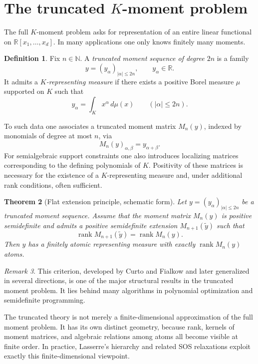 \documentclass[11pt]{amsart}
\numberwithin{equation}{section}
\newtheorem{theorem}{Theorem}[section]
\theoremstyle{definition}
\newtheorem{definition}[theorem]{Definition}
\theoremstyle{remark}
\newtheorem{remark}[theorem]{Remark}
\newcommand{\R}{\mathbb{R}}
\newcommand{\N}{\mathbb{N}}
\newcommand{\Rxd}{\R[x_1,\dots,x_d]}
\newcommand{\rank}{\operatorname{rank}}
\newcommand{\1}{\mathbf{1}}
\begin{document}
\section{The truncated \(K\)-moment problem}\label{sec:truncated}

The full \(K\)-moment problem asks for representation of an entire linear functional on \(\Rxd\). In many applications one only knows finitely many moments.

\begin{definition}
Fix \(n\in\N\). A \emph{truncated moment sequence of degree \(2n\)} is a family
\[
y=(y_\alpha)_{|\alpha|\le 2n}, \qquad y_\alpha\in\R.
\]
It admits a \emph{\(K\)-representing measure} if there exists a positive Borel measure \(\mu\) supported on \(K\) such that
\[
y_\alpha=\int_K x^\alpha\,d\mu(x) \qquad (|\alpha|\le 2n).
\]
\end{definition}

To such data one associates a truncated moment matrix \(M_n(y)\), indexed by monomials of degree at most \(n\), via
\[
M_n(y)_{\alpha,\beta}=y_{\alpha+\beta}.
\]
For semialgebraic support constraints one also introduces localizing matrices corresponding to the defining polynomials of \(K\). Positivity of these matrices is necessary for the existence of a \(K\)-representing measure and, under additional rank conditions, often sufficient.

\begin{theorem}[Flat extension principle, schematic form]\label{thm:flat}
Let \(y=(y_\alpha)_{|\alpha|\le 2n}\) be a truncated moment sequence. Assume that the moment matrix \(M_n(y)\) is positive semidefinite and admits a positive semidefinite extension \(M_{n+1}(\widetilde y)\) such that
\[
\rank M_{n+1}(\widetilde y)=\rank M_n(y).
\]
Then \(y\) has a finitely atomic representing measure with exactly \(\rank M_n(y)\) atoms.
\end{theorem}

\begin{remark}
This criterion, developed by Curto and Fialkow and later generalized in several directions, is one of the major structural results in the truncated moment problem. It lies behind many algorithms in polynomial optimization and semidefinite programming.
\end{remark}

The truncated theory is not merely a finite-dimensional approximation of the full moment problem. It has its own distinct geometry, because rank, kernels of moment matrices, and algebraic relations among atoms all become visible at finite order. In practice, Lasserre's hierarchy and related SOS relaxations exploit exactly this finite-dimensional viewpoint.
\end{document}
